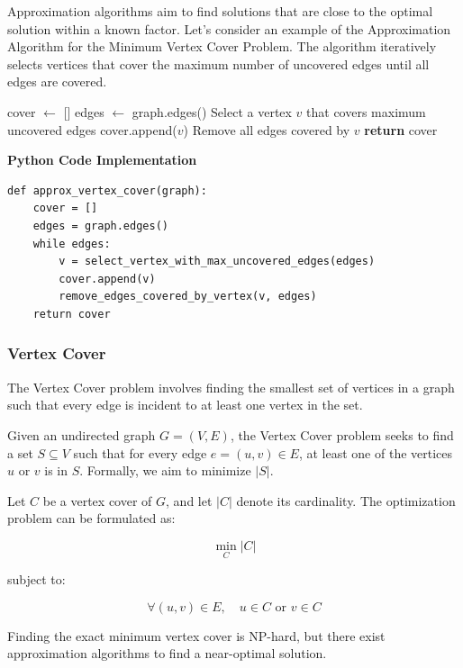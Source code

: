 \documentclass[12pt]{book} %
\begin{document}
Approximation algorithms aim to find solutions that are close to the optimal solution within a known factor. Let's consider an example of the Approximation Algorithm for the Minimum Vertex Cover Problem. The algorithm iteratively selects vertices that cover the maximum number of uncovered edges until all edges are covered.
\FloatBarrier
\begin{algorithm}
\caption{Approximation Algorithm for Minimum Vertex Cover}\label{approx_vc}
\begin{algorithmic}[1]
\State cover $\gets$ []
\State edges $\gets$ graph.edges()
    \State Select a vertex $v$ that covers maximum uncovered edges
    \State cover.append($v$)
    \State Remove all edges covered by $v$
\EndWhile
\State \textbf{return} cover
\EndProcedure
\end{algorithmic}
\end{algorithm}
\FloatBarrier
\textbf{Python Code Implementation}
\FloatBarrier
\begin{lstlisting}
def approx_vertex_cover(graph):
    cover = []
    edges = graph.edges()
    while edges:
        v = select_vertex_with_max_uncovered_edges(edges)
        cover.append(v)
        remove_edges_covered_by_vertex(v, edges)
    return cover
\end{lstlisting}
\FloatBarrier

\subsubsection{Vertex Cover}

The Vertex Cover problem involves finding the smallest set of vertices in a graph such that every edge is incident to at least one vertex in the set.

Given an undirected graph \(G = (V, E)\), the Vertex Cover problem seeks to find a set \(S \subseteq V\) such that for every edge \(e = (u, v) \in E\), at least one of the vertices \(u\) or \(v\) is in \(S\). Formally, we aim to minimize \(|S|\).

Let \(C\) be a vertex cover of \(G\), and let \(|C|\) denote its cardinality. The optimization problem can be formulated as:

\[
\min_{C} |C|
\]

subject to:

\[
\forall (u, v) \in E, \quad u \in C \text{ or } v \in C
\]

Finding the exact minimum vertex cover is NP-hard, but there exist approximation algorithms to find a near-optimal solution.
\end{document}
